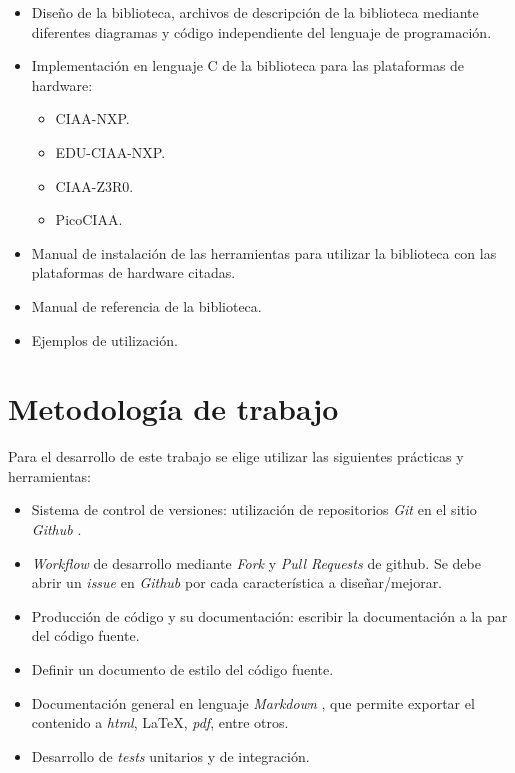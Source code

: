 \begin{itemize}
\item
Diseño de la biblioteca, archivos de descripción de la biblioteca mediante diferentes diagramas y código independiente del lenguaje de programación.
\item
Implementación en lenguaje C de la biblioteca para las plataformas de hardware:
\begin{itemize}
\item CIAA-NXP.
\item EDU-CIAA-NXP.
\item CIAA-Z3R0.
\item PicoCIAA.
\end{itemize}
\item
Manual de instalación de las herramientas para utilizar la biblioteca con las plataformas de hardware citadas.
\item
Manual de referencia de la biblioteca.
\item
Ejemplos de utilización.
\end{itemize}

\section{Metodología de trabajo}

Para el desarrollo de este trabajo se elige utilizar las siguientes prácticas y herramientas:

\begin{itemize}
\item
Sistema de control de versiones: utilización de repositorios \emph{Git} \citep{GIT} en el sitio \emph{Github} \citep{GITHUB}. 
\item
\emph{Workflow} de desarrollo mediante \emph{Fork} y \emph{Pull Requests} de github. Se debe abrir un \emph{issue} en \emph{Github} por cada característica a diseñar/mejorar.
\item
Producción de código y su documentación: escribir la documentación a la par del código fuente.
\item
Definir un documento de estilo del código fuente.
\item
Documentación general en lenguaje \emph{Markdown} \citep{MARKDOWN}, que permite exportar el contenido a \emph{html}, \LaTeX, \emph{pdf}, entre otros.
\item
Desarrollo de \emph{tests} unitarios y de integración.
\end{itemize}
